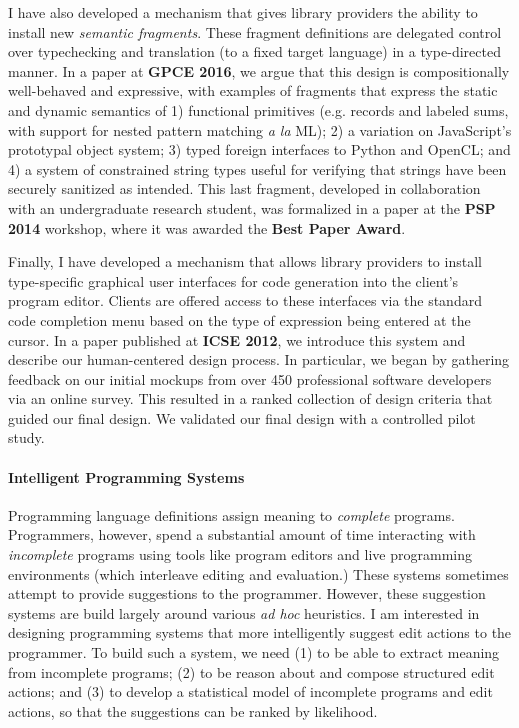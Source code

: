 \documentclass[9pt]{extarticle}
\let\li\lstinline
\begin{document}
I have also developed a mechanism that gives library providers the ability to install new \emph{semantic fragments}. These fragment definitions are delegated control over typechecking and translation (to a fixed target language) in a type-directed manner. In a paper at \textbf{GPCE 2016}, we argue that this design is compositionally well-behaved and expressive, with examples of
fragments that express the static and dynamic semantics of
1) functional primitives (e.g. records and labeled sums, with support for nested pattern
matching \emph{a la} ML); 2) a variation on JavaScript's prototypal
object system; 3) typed foreign interfaces to Python and
OpenCL; and 4) a system of constrained string types useful for verifying that strings have been securely sanitized as intended. This last fragment, developed in collaboration with an undergraduate research student, was formalized in a paper at the \textbf{PSP 2014} workshop, where it was awarded the \textbf{Best Paper Award}. %

Finally, I have developed a mechanism that allows library providers to install type-specific {graphical user interfaces} for code generation into the client's program editor. Clients are offered access to these interfaces via the standard code completion menu based on the type of expression being entered at the cursor. In a paper published at \textbf{ICSE 2012}, we introduce this system and describe our human-centered design process. In particular, we began by gathering feedback on our initial mockups from over 450 professional software developers via an online survey. This resulted in a ranked collection of design criteria that guided our final design. We validated our final design with a controlled pilot study.

\vspace{-8px}
\paragraph{Intelligent Programming Systems}
Programming language definitions assign meaning to \emph{complete} programs. 
Programmers, however, spend a substantial amount of time interacting with \emph{incomplete} programs using tools like program editors and live programming environments (which interleave editing and evaluation.) These systems sometimes attempt to provide suggestions to the programmer. However, these suggestion systems are build largely around various \emph{ad hoc} heuristics. I am interested in designing programming systems that more intelligently suggest edit actions to the programmer. To build such a system, we need (1) to be able to extract meaning from incomplete programs; (2) to be reason about and compose structured edit actions; and (3) to develop a statistical model of incomplete programs and edit actions, so that the suggestions can be ranked by likelihood.
\end{document}
